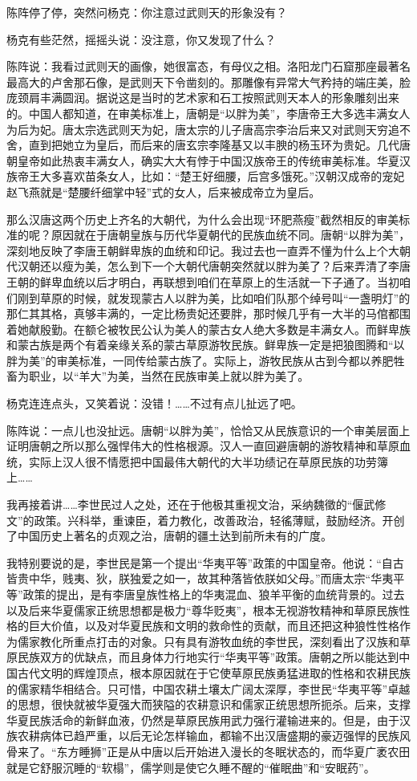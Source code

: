 \par 陈阵停了停，突然问杨克：你注意过武则天的形象没有？
\par 杨克有些茫然，摇摇头说：没注意，你又发现了什么？
\par 陈阵说：我看过武则天的画像，她很富态，有母仪之相。洛阳龙门石窟那座最著名最高大的卢舍那石像，是武则天下令凿刻的。那雕像有异常大气矜持的端庄美，脸庞颈肩丰满圆润。据说这是当时的艺术家和石工按照武则天本人的形象雕刻出来的。中国人都知道，在审美标准上，唐朝是“以胖为美”，李唐帝王大多选丰满女人为后为妃。唐太宗选武则天为妃，唐太宗的儿子唐高宗李治后来又对武则天穷追不舍，直到把她立为皇后，而后来的唐玄宗李隆基又以丰腴的杨玉环为贵妃。几代唐朝皇帝如此热衷丰满女人，确实大大有悖于中国汉族帝王的传统审美标准。华夏汉族帝王大多喜欢苗条女人，比如：“楚王好细腰，后宫多饿死。”汉朝汉成帝的宠妃赵飞燕就是“楚腰纤细掌中轻”式的女人，后来被成帝立为皇后。
\par 那么汉唐这两个历史上齐名的大朝代，为什么会出现“环肥燕瘦”截然相反的审美标准的呢？原因就在于唐朝皇族与历代华夏朝代的民族血统不同。唐朝“以胖为美”，深刻地反映了李唐王朝鲜卑族的血统和印记。我过去也一直弄不懂为什么上个大朝代汉朝还以瘦为美，怎么到下一个大朝代唐朝突然就以胖为美了？后来弄清了李唐王朝的鲜卑血统以后才明白，再联想到咱们在草原上的生活就一下子通了。当初咱们刚到草原的时候，就发现蒙古人以胖为美，比如咱们队那个绰号叫“一盏明灯”的那仁其其格，真够丰满的，一定比杨贵妃还要胖，那时候几乎有一大半的马倌都围着她献殷勤。在额仑被牧民公认为美人的蒙古女人绝大多数是丰满女人。而鲜卑族和蒙古族是两个有着亲缘关系的蒙古草原游牧民族。鲜卑族一定是把狼图腾和“以胖为美”的审美标准，一同传给蒙古族了。实际上，游牧民族从古到今都以养肥牲畜为职业，以“羊大”为美，当然在民族审美上就以胖为美了。
\par 杨克连连点头，又笑着说：没错！……不过有点儿扯远了吧。
\par 陈阵说：一点儿也没扯远。唐朝“以胖为美”，恰恰又从民族意识的一个审美层面上证明唐朝之所以那么强悍伟大的性格根源。汉人一直回避唐朝的游牧精神和草原血统，实际上汉人很不情愿把中国最伟大朝代的大半功绩记在草原民族的功劳簿上……
\par 我再接着讲……李世民过人之处，还在于他极其重视文治，采纳魏徵的“偃武修文”的政策。兴科举，重谏臣，着力教化，改善政治，轻徭薄赋，鼓励经济。开创了中国历史上著名的贞观之治，唐朝的疆土达到前所未有的广度。
\par 我特别要说的是，李世民是第一个提出“华夷平等”政策的中国皇帝。他说：“自古皆贵中华，贱夷、狄，朕独爱之如一，故其种落皆依朕如父母。”而唐太宗“华夷平等”政策的提出，是有李唐皇族性格上的华夷混血、狼羊平衡的血统背景的。过去以及后来华夏儒家正统思想都是极力“尊华贬夷”，根本无视游牧精神和草原民族性格的巨大价值，以及对华夏民族和文明的救命性的贡献，而且还把这种狼性性格作为儒家教化所重点打击的对象。只有具有游牧血统的李世民，深刻看出了汉族和草原民族双方的优缺点，而且身体力行地实行“华夷平等”政策。唐朝之所以能达到中国古代文明的辉煌顶点，根本原因就在于它使草原民族勇猛进取的性格和农耕民族的儒家精华相结合。只可惜，中国农耕土壤太广阔太深厚，李世民“华夷平等”卓越的思想，很快就被华夏强大而狭隘的农耕意识和儒家正统思想所扼杀。后来，支撑华夏民族活命的新鲜血液，仍然是草原民族用武力强行灌输进来的。但是，由于汉族农耕病体已趋严重，以后无论怎样输血，都输不出汉唐盛期的豪迈强悍的民族风骨来了。“东方睡狮”正是从中唐以后开始进入漫长的冬眠状态的，而华夏广袤农田就是它舒服沉睡的“软榻”，儒学则是使它久睡不醒的“催眠曲”和“安眠药”。
